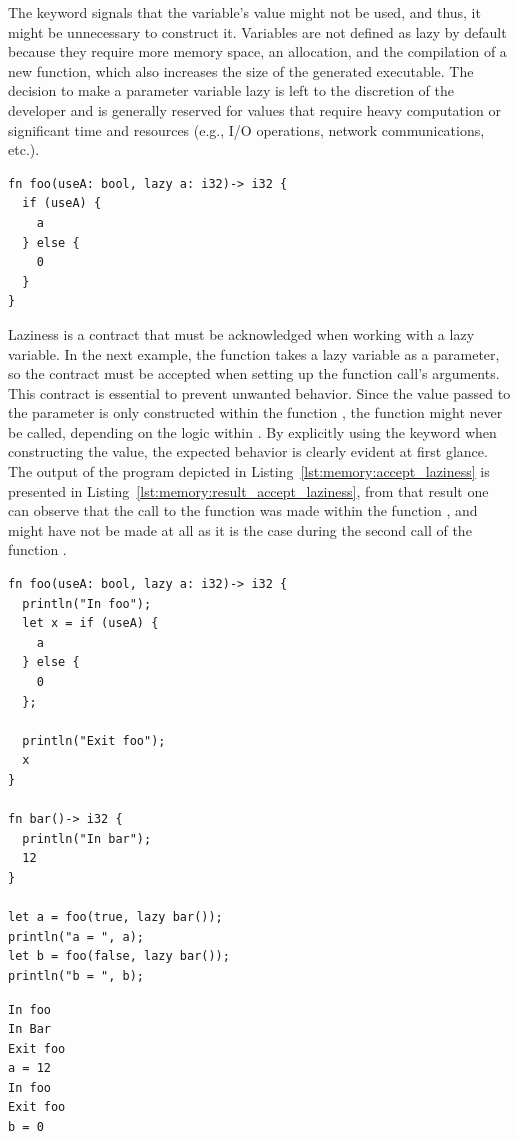The keyword  signals that the variable's value might not be used,
and thus, it might be unnecessary to construct it. Variables are not defined as
lazy by default because they require more memory space, an allocation, and the
compilation of a new function, which also increases the size of the generated
executable. The decision to make a parameter variable lazy is left to the
discretion of the developer and is generally reserved for values that require
heavy computation or significant time and resources (e.g., I/O operations,
network communications, etc.).

\begin{lstlisting}[style=coloredverbatim]
fn foo(useA: bool, lazy a: i32)-> i32 {
  if (useA) {
    a
  } else {
    0
  }
}
\end{lstlisting}

Laziness is a contract that must be acknowledged when working with a lazy
variable. In the next example, the function  takes a lazy variable as
a parameter, so the contract must be accepted when setting up the function
call's arguments. This contract is essential to prevent unwanted behavior. Since
the value passed to the parameter  is only constructed within the
function , the function  might never be called, depending
on the logic within . By explicitly using the  keyword
when constructing the value, the expected behavior is clearly evident at first
glance. The output of the program depicted in Listing~\ref{lst:memory:accept_laziness}
is presented in Listing~\ref{lst:memory:result_accept_laziness}, from that result one
can observe that the call to the function  was made within the
function , and might have not be made at all as it is the case during
the second call of the function .

\begin{lstlisting}[style=coloredverbatim, label=lst:memory:accept_laziness, caption=Example of laziness contract acceptance]
fn foo(useA: bool, lazy a: i32)-> i32 {
  println("In foo");
  let x = if (useA) {
    a
  } else {
    0
  };

  println("Exit foo");
  x
}

fn bar()-> i32 {
  println("In bar");
  12
}

let a = foo(true, lazy bar());
println("a = ", a);
let b = foo(false, lazy bar());
println("b = ", b);
\end{lstlisting}

\begin{lstlisting}[style=bashVerb, caption=Result of execution of Listing~\ref{lst:memory:accept_laziness}, label=lst:memory:result_accept_laziness]
In foo
In Bar
Exit foo
a = 12
In foo
Exit foo
b = 0
\end{lstlisting}

